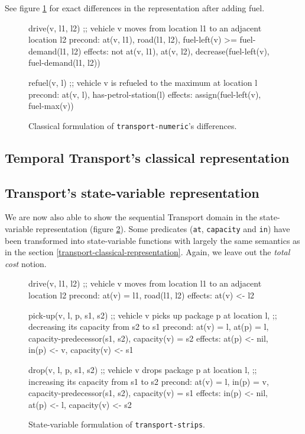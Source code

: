 See figure \ref{code:classical-numeric} for exact differences
in the representation after adding fuel.

\begin{figure}[htb]
\begin{code}
drive(v, l1, l2)
  ;; vehicle v moves from location l1 to an adjacent location l2
  precond: at(v, l1), road(l1, l2), fuel-left(v) >= fuel-demand(l1, l2)
  effects: not at(v, l1), at(v, l2),
           decrease(fuel-left(v),  fuel-demand(l1, l2))
  
refuel(v, l)
  ;; vehicle v is refueled to the maximum at location l
  precond: at(v, l), has-petrol-station(l)
  effects: assign(fuel-left(v), fuel-max(v))
\end{code}
\caption{Classical formulation of \texttt{transport-numeric}'s differences.}
\label{code:classical-numeric}
\end{figure}

\subsection{Temporal Transport's classical representation}


\subsection{Transport's state-variable representation}

We are now also able to show the sequential Transport domain
in the state-variable representation (figure \ref{code:statevar-strips}).
Some predicates (\verb+at+, \verb+capacity+ and \verb+in+) have been transformed
into state-variable functions with largely the same semantics as in
the section \ref{transport-classical-representation}. Again, we leave out
the \textit{total cost} notion.

\begin{figure}[htb]
\begin{code}
drive(v, l1, l2)
  ;; vehicle v moves from location l1 to an adjacent location l2
  precond: at(v) = l1, road(l1, l2)
  effects: at(v) <- l2

pick-up(v, l, p, s1, s2)
  ;; vehicle v picks up package p at location l,
  ;; decreasing its capacity from s2 to s1
  precond: at(v) = l, at(p) = l, capacity-predecessor(s1, s2),
           capacity(v) = s2
  effects: at(p) <- nil, in(p) <- v, capacity(v) <- s1
  
drop(v, l, p, s1, s2)
  ;; vehicle v drops package p at location l,
  ;; increasing its capacity from s1 to s2
  precond: at(v) = l, in(p) = v, capacity-predecessor(s1, s2),
           capacity(v) = s1
  effects: in(p) <- nil, at(p) <- l, capacity(v) <- s2
\end{code}
\caption{State-variable formulation of \texttt{transport-strips}.}
\label{code:statevar-strips}
\end{figure}


